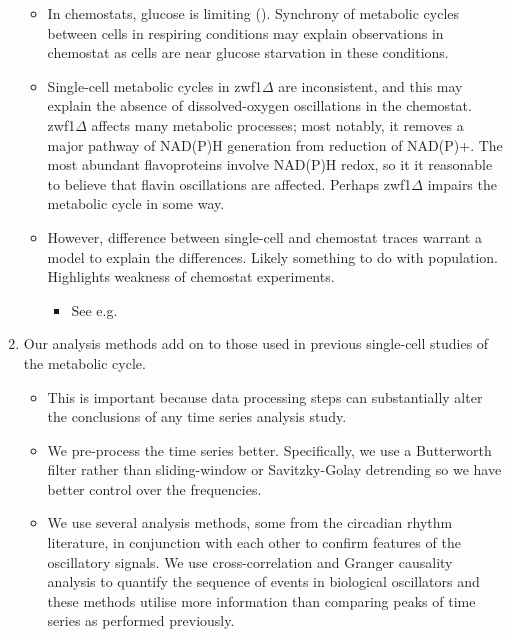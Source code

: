 \begin{enumerate}
\begin{itemize}
\item In chemostats, glucose is limiting (\cite{jonesCyberneticModelGrowth1999}).  Synchrony of metabolic cycles between cells in respiring conditions may explain observations in chemostat as cells are near glucose starvation in these conditions.
\item Single-cell metabolic cycles in zwf1\(\Delta\) are inconsistent, and this may explain the absence of dissolved-oxygen oscillations in the chemostat.  zwf1\(\Delta\) affects many metabolic processes; most notably, it removes a major pathway of NAD(P)H generation from reduction of NAD(P)+.  The most abundant flavoproteins involve NAD(P)H redox, so it it reasonable to believe that flavin oscillations are affected.  Perhaps zwf1\(\Delta\) impairs the metabolic cycle in some way.
\item However, difference between single-cell and chemostat traces warrant a model to explain the differences.  Likely something to do with population.  Highlights weakness of chemostat experiments.
\begin{itemize}
\item See e.g. \cite{burnettiCellCycleStart2016}
\end{itemize}
\end{itemize}
\item Our analysis methods add on to those used in previous single-cell studies of the metabolic cycle.
\begin{itemize}
\item This is important because data processing steps can substantially alter the conclusions of any time series analysis study.
\item We pre-process the time series better.  Specifically, we use a Butterworth filter rather than sliding-window or Savitzky-Golay detrending so we have better control over the frequencies.
\item We use several analysis methods, some from the circadian rhythm literature, in conjunction with each other to confirm features of the oscillatory signals.  We use cross-correlation and Granger causality analysis to quantify the sequence of events in biological oscillators and these methods utilise more information than comparing peaks of time series as performed previously.
\end{itemize}
\end{enumerate}

